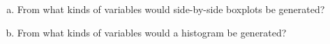 
\begin{enumerate}[(a)]
\item From what kinds of variables would side-by-side boxplots be
  generated?
 
\begin{MultipleChoice}
\end{MultipleChoice}

\item From what kinds of variables would a histogram be generated?

\begin{MultipleChoice}
\end{MultipleChoice}
\end{enumerate}

